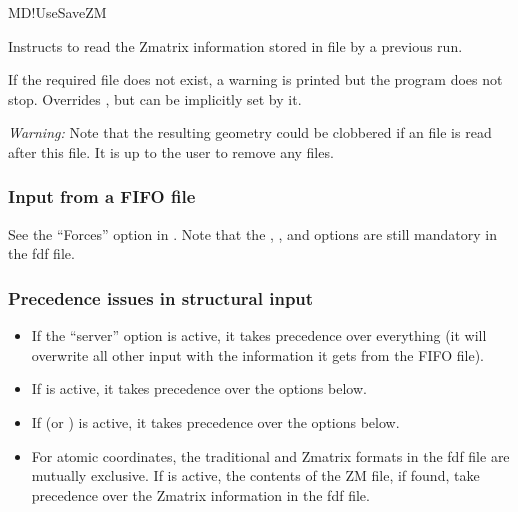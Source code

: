 \begin{fdflogicalF}{MD!UseSaveZM}

  Instructs to read the Zmatrix information stored
  in file  by a previous run.

  If the required file does not exist, a warning is
  printed but the program does not stop. Overrides ,
  but can be implicitly set by it.
  
  \textit{Warning:} Note that the resulting geometry could be clobbered if
  an  file is read after this file. It is up to the user to remove
  any  files.
  
\end{fdflogicalF}



\subsubsection{Input from a FIFO file}

See the ``Forces'' option in .  Note that the
, , and
 options are still mandatory in the fdf
file.

\subsubsection{Precedence issues in structural input}

\begin{itemize}
  \item If the ``server'' option is active, it takes precedence over
  everything (it will overwrite all other input with the information it
  gets from the FIFO file).

  \item If  is active, it takes precedence over the options below.

  \item If  (or ) is active, it takes precedence
  over the options below.

  \item For atomic coordinates, the traditional and Zmatrix formats in
  the fdf file are mutually exclusive. If  is
  active, the contents of the ZM file, if found, take precedence over
  the Zmatrix information in the fdf file.

\end{itemize}

